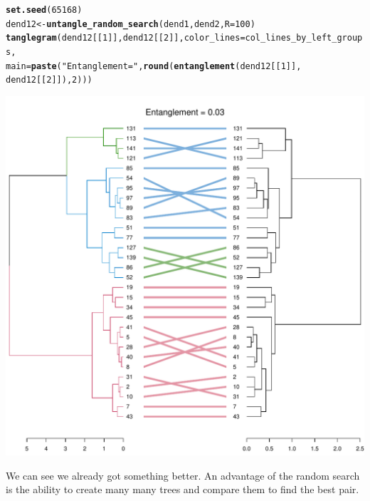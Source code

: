 \documentclass[shortnames,nojss,article]{jss}\usepackage[]{graphicx}\usepackage[]{color}
\makeatletter
\def\maxwidth{ %
  \ifdim\Gin@nat@width>\linewidth
    \linewidth
  \else
    \Gin@nat@width
  \fi
}
\newcommand{\hlnum}[1]{\textcolor[rgb]{0.686,0.059,0.569}{#1}}%
\newcommand{\hlstr}[1]{\textcolor[rgb]{0.192,0.494,0.8}{#1}}%
\newcommand{\hlstd}[1]{\textcolor[rgb]{0.345,0.345,0.345}{#1}}%
\newcommand{\hlkwb}[1]{\textcolor[rgb]{0.69,0.353,0.396}{#1}}%
\newcommand{\hlkwc}[1]{\textcolor[rgb]{0.333,0.667,0.333}{#1}}%
\newcommand{\hlkwd}[1]{\textcolor[rgb]{0.737,0.353,0.396}{\textbf{#1}}}%
\newenvironment{kframe}{%
 \def\at@end@of@kframe{}%
 \ifinner\ifhmode%
  \def\at@end@of@kframe{\end{minipage}}%
  \begin{minipage}{\columnwidth}%
 \fi\fi%
 \def\FrameCommand##1{\hskip\@totalleftmargin \hskip-\fboxsep
 \colorbox{shadecolor}{##1}\hskip-\fboxsep
     \hskip-\linewidth \hskip-\@totalleftmargin \hskip\columnwidth}%
 \MakeFramed {\advance\hsize-\width
   \@totalleftmargin\z@ \linewidth\hsize
   \@setminipage}}%
 {\par\unskip\endMakeFramed%
 \at@end@of@kframe}
\newenvironment{knitrout}{}{} %
\makeatother
\begin{document}
\begin{knitrout}
\color{fgcolor}\begin{kframe}
\begin{alltt}
\hlkwd{set.seed}\hlstd{(}\hlnum{65168}\hlstd{)}
\hlstd{dend12} \hlkwb{<-} \hlkwd{untangle_random_search}\hlstd{(dend1, dend2,} \hlkwc{R} \hlstd{=} \hlnum{100}\hlstd{)}
\hlkwd{tanglegram}\hlstd{(dend12[[}\hlnum{1}\hlstd{]], dend12[[}\hlnum{2}\hlstd{]],} \hlkwc{color_lines} \hlstd{= col_lines_by_left_groups,}
    \hlkwc{main} \hlstd{=} \hlkwd{paste}\hlstd{(}\hlstr{"Entanglement ="}\hlstd{,} \hlkwd{round}\hlstd{(}\hlkwd{entanglement}\hlstd{(dend12[[}\hlnum{1}\hlstd{]],}
        \hlstd{dend12[[}\hlnum{2}\hlstd{]]),} \hlnum{2}\hlstd{)))}
\end{alltt}
\end{kframe}

{\centering \includegraphics[width=\maxwidth]{figure/unnamed-chunk-35} 

}



\end{knitrout}


We can see we already got something better. An advantage of the random search is the ability to create many many trees and compare them to find the best pair.
\end{document}
